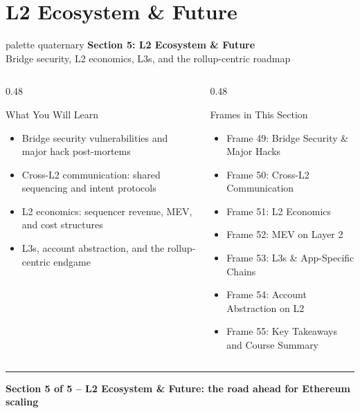 \documentclass[8pt,aspectratio=169]{beamer}
\newcommand{\bottomnote}[1]{\vfill\vspace{-2mm}\textcolor{mllavender2}{\rule{\textwidth}{0.4pt}}\vspace{1mm}\footnotesize\textbf{#1}}
\begin{document}
\section{L2 Ecosystem \& Future}

\begin{frame}{}
\vspace{10mm}
\begin{beamercolorbox}[sep=12pt,center,rounded=true,shadow=true]{palette quaternary}
{\Large\bfseries Section 5: L2 Ecosystem \& Future}\\[6pt]
{\normalsize Bridge security, L2 economics, L3s, and the rollup-centric roadmap}
\end{beamercolorbox}
\vspace{6mm}
\begin{columns}[T]
\begin{column}{0.48\textwidth}
\begin{block}{What You Will Learn}
\begin{itemize}\setlength\itemsep{3pt}
  \item[\small$\checkmark$] \small Bridge security vulnerabilities and major hack post-mortems
  \item[\small$\checkmark$] \small Cross-L2 communication: shared sequencing and intent protocols
  \item[\small$\checkmark$] \small L2 economics: sequencer revenue, MEV, and cost structures
  \item[\small$\checkmark$] \small L3s, account abstraction, and the rollup-centric endgame
\end{itemize}
\end{block}
\end{column}
\begin{column}{0.48\textwidth}
\begin{block}{Frames in This Section}
\begin{itemize}\setlength\itemsep{3pt}
  \item[\small$\bullet$] \small Frame 49: Bridge Security \& Major Hacks
  \item[\small$\bullet$] \small Frame 50: Cross-L2 Communication
  \item[\small$\bullet$] \small Frame 51: L2 Economics
  \item[\small$\bullet$] \small Frame 52: MEV on Layer 2
  \item[\small$\bullet$] \small Frame 53: L3s \& App-Specific Chains
  \item[\small$\bullet$] \small Frame 54: Account Abstraction on L2
  \item[\small$\bullet$] \small Frame 55: Key Takeaways and Course Summary
\end{itemize}
\end{block}
\end{column}
\end{columns}
\bottomnote{Section 5 of 5 -- L2 Ecosystem \& Future: the road ahead for Ethereum scaling}
\end{frame}
\end{document}
